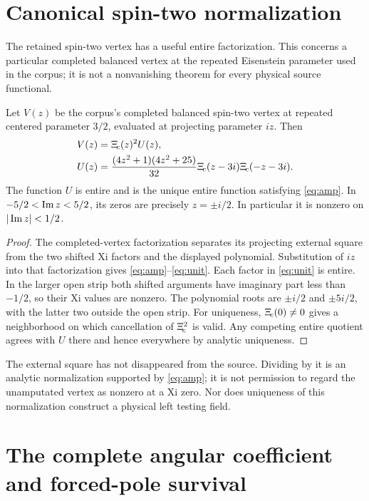 \section{Canonical spin-two normalization}

The retained spin-two vertex has a useful entire factorization. This concerns a particular completed balanced vertex at the repeated Eisenstein parameter used in the corpus; it is not a nonvanishing theorem for every physical source functional.

\begin{theorem}\label{thm:amputation}
Let \(V(z)\) be the corpus's completed balanced spin-two vertex at repeated centered parameter \(3/2\), evaluated at projecting parameter \(iz\). Then
\begin{align}
 V(z)&=\Xi_{\!c}(z)^2U(z),\label{eq:amp}\\
 U(z)&=\frac{(4z^2+1)(4z^2+25)}{32}
          \Xi_{\!c}(z-3i)\Xi_{\!c}(-z-3i).\label{eq:unit}
\end{align}
The function \(U\) is entire and is the unique entire function satisfying \eqref{eq:amp}. In \(-5/2<\operatorname{Im} z<5/2\), its zeros are precisely \(z=\pm i/2\). In particular it is nonzero on \(|\operatorname{Im} z|<1/2\).
\end{theorem}
\begin{proof}
The completed-vertex factorization separates its projecting external square from the two shifted Xi factors and the displayed polynomial. Substitution of \(iz\) into that factorization gives \eqref{eq:amp}--\eqref{eq:unit}. Each factor in \eqref{eq:unit} is entire. In the larger open strip both shifted arguments have imaginary part less than \(-1/2\), so their Xi values are nonzero. The polynomial roots are \(\pm i/2\) and \(\pm5i/2\), with the latter two outside the open strip. For uniqueness, \(\Xi_{\!c}(0)\ne0\) gives a neighborhood on which cancellation of \(\Xi_{\!c}^2\) is valid. Any competing entire quotient agrees with \(U\) there and hence everywhere by analytic uniqueness.
\end{proof}

The external square has not disappeared from the source. Dividing by it is an analytic normalization supported by \eqref{eq:amp}; it is not permission to regard the unamputated vertex as nonzero at a Xi zero. Nor does uniqueness of this normalization construct a physical left testing field.

\section{The complete angular coefficient and forced-pole survival}

